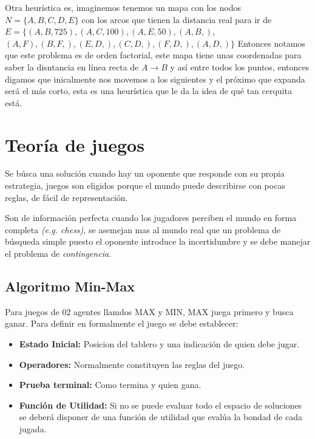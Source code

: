 Otra heurística es, imaginemos tenemos un mapa con los nodos
$N=\{A, B, C, D, E\}$ con los arcos que tienen la distancia real para ir de $E=\{(A, B, 725), (A, C, 100), (A, E, 50), (A, B, ),$ $(A, F), (B, F, ), (E, D, ), (C, D, ), (F, D, ), (A, D, )\}$
Entonces notamos que este problema es de orden factorial, este mapa tiene unas coordenadas para saber la disntancia en línea recta de $A\to B$ y así entre todos los puntos, entonces digamos que inicalmente nos movemos a los siguientes y el próximo que expanda será el más corto, esta es una heurística que le da la idea de qué tan cerquita está.



\section{Teoría de juegos}
Se búsca una solución cuando hay un oponente que responde con su propia estrategia, juegos son eligidos porque el mundo puede describirse con pocas reglas, de fácil de representación.

Son de información perfecta cuando los jugadores perciben el mundo en forma completa \textit{(e.g. chess)}, se asemejan mas al mundo real que un problema de búsqueda simple puesto el oponente introduce la incertidumbre y se debe manejar el problema de \textit{contingencia}.

\subsection{Algoritmo Min-Max}
Para juegos de 02 agentes llamdos MAX y MIN, MAX juega primero y busca ganar.
Para definir en formalmente el juego se debe establecer:

\begin{itemize}
	\item \textbf{Estado Inicial:} Posicion del tablero y una indicación de quien debe jugar.
	\item \textbf{Operadores:} Normalmente constituyen las reglas del juego.
	\item \textbf{Prueba terminal:} Como termina y quien gana.
	\item \textbf{Función de Utilidad:} Si no se puede evaluar todo el espacio de soluciones se deberá disponer de una función de utilidad que evalúa la bondad de cada jugada.

\end{itemize}

